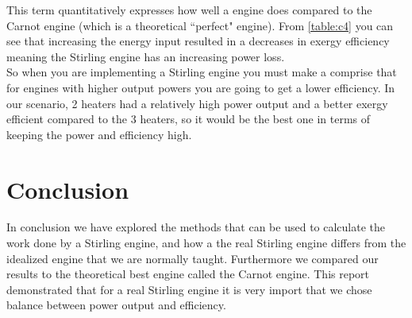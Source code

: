 \documentclass[10pt]{article}
\begin{document}
This term quantitatively expresses how well a engine does compared to the Carnot engine (which is a theoretical ``perfect" engine). From \autoref{table:c4} you can see that increasing the energy input resulted in a decreases in exergy efficiency meaning the Stirling engine has an increasing power loss. \\So when you are implementing a Stirling engine you must make a comprise that for engines with higher output powers you are going to get a lower efficiency. In our scenario, 2 heaters had a relatively high power output and a better exergy efficient compared to the 3 heaters, so it would be the best one in terms of keeping the power and efficiency high. 


\section{Conclusion}

In conclusion we have explored the methods that can be used to calculate the work done by a Stirling engine, and how a the real Stirling engine differs from the idealized engine that we are normally taught. Furthermore we compared our results to the theoretical best engine called the Carnot engine. This report demonstrated that for a real Stirling engine it is very import that we chose balance between power output and efficiency.
\end{document}
